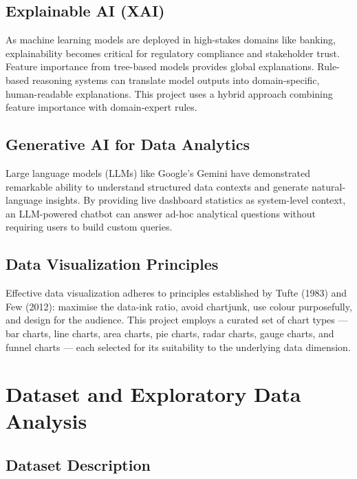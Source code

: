 \documentclass[12pt, a4paper]{report}
\begin{document}
\section{Explainable AI (XAI)}

As machine learning models are deployed in high-stakes domains like banking, explainability becomes critical for regulatory compliance and stakeholder trust. Feature importance from tree-based models provides global explanations. Rule-based reasoning systems can translate model outputs into domain-specific, human-readable explanations. This project uses a hybrid approach combining feature importance with domain-expert rules.

\section{Generative AI for Data Analytics}

Large language models (LLMs) like Google's Gemini have demonstrated remarkable ability to understand structured data contexts and generate natural-language insights. By providing live dashboard statistics as system-level context, an LLM-powered chatbot can answer ad-hoc analytical questions without requiring users to build custom queries.

\section{Data Visualization Principles}

Effective data visualization adheres to principles established by Tufte (1983) and Few (2012): maximise the data-ink ratio, avoid chartjunk, use colour purposefully, and design for the audience. This project employs a curated set of chart types --- bar charts, line charts, area charts, pie charts, radar charts, gauge charts, and funnel charts --- each selected for its suitability to the underlying data dimension.


\chapter{Dataset and Exploratory Data Analysis}

\section{Dataset Description}
\end{document}
